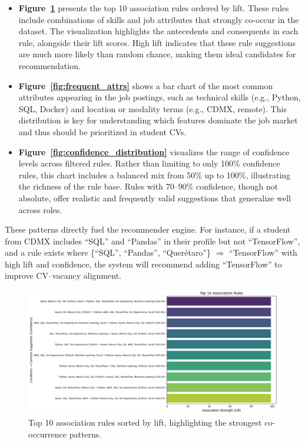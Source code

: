 \documentclass[runningheads]{llncs}
\begin{document}
	\begin{itemize}
		\item \textbf{Figure~\ref{fig:top_rules}} presents the top 10 association rules ordered by lift. These rules include combinations of skills and job attributes that strongly co-occur in the dataset. The visualization highlights the antecedents and consequents in each rule, alongside their lift scores. High lift indicates that these rule suggestions are much more likely than random chance, making them ideal candidates for recommendation.
		
		\item \textbf{Figure~\ref{fig:frequent_attrs}} shows a bar chart of the most common attributes appearing in the job postings, such as technical skills (e.g., Python, SQL, Docker) and location or modality terms (e.g., CDMX, remote). This distribution is key for understanding which features dominate the job market and thus should be prioritized in student CVs.
		
		\item \textbf{Figure~\ref{fig:confidence_distribution}} visualizes the range of confidence levels across filtered rules. Rather than limiting to only 100\% confidence rules, this chart includes a balanced mix from 50\% up to 100\%, illustrating the richness of the rule base. Rules with 70–90\% confidence, though not absolute, offer realistic and frequently valid suggestions that generalize well across roles.
	\end{itemize}
	These patterns directly fuel the recommender engine. For instance, if a student from CDMX includes “SQL” and “Pandas” in their profile but not “TensorFlow”, and a rule exists where \{“SQL”, “Pandas”, “Querétaro”\} $\Rightarrow$ “TensorFlow” with high lift and confidence, the system will recommend adding “TensorFlow” to improve CV–vacancy alignment.
	\begin{figure}[H]
		\centering
		\includegraphics[width=1.15\linewidth]{imagenes/top_rules.png}
		\caption{Top 10 association rules sorted by lift, highlighting the strongest co-occurrence patterns.}
		\label{fig:top_rules}
	\end{figure}
	
\end{document}
